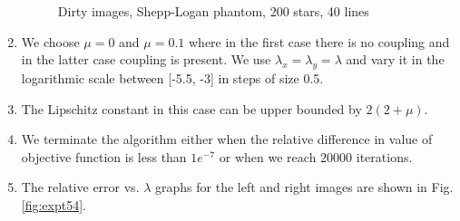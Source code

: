 \begin{enumerate}
\begin{figure}[!b]
\hspace{0.4in}
		\hspace{0.2in}
\caption [Dirty images,  Shepp-Logan phantom, 200 stars, 40 lines]{Dirty images,  Shepp-Logan phantom, 200 stars, 40 lines}
\label{fig:expt53}
\end{figure}

\item We choose $\mu = 0$ and $\mu = 0.1$ where in the first case there is no coupling and in the latter case coupling is present. We use $\lambda_x = \lambda_y = \lambda$ and vary it in the logarithmic scale between [-5.5, -3] in steps of size 0.5. 
\item The Lipschitz constant in this case can be upper bounded by $2(2 + \mu)$.
\item We terminate the algorithm either when the relative difference in value of objective function is less than $1e^{-7}$ or when we reach 20000 iterations.


\item The relative error vs.  $\lambda$ graphs for the left and right images are shown in Fig. \ref{fig:expt54}.


\end{enumerate}
